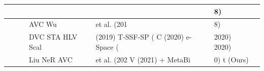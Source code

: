 \begin{tabular}{lllllll}
\toprule
 &  &  &  &  & 8) &  \\
\midrule
 &  &  & AVC Wu & et al. (201 & 8) &  \\
 &  &  & DVC STA HLV Scal & (2019) T-SSF-SP ( C (2020) e-Space ( & 2020) 2020) &  \\
 &  &  & Liu NeR AVC & et al. (202 V (2021) + MetaBi & 0) t (Ours) &  \\
\bottomrule
\end{tabular}
